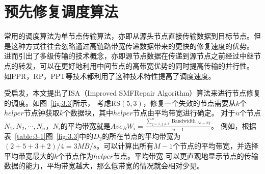 


\section{预先修复调度算法}
常用的调度算法为单节点传输算法，亦即从源头节点直接传输数据到目标节点。但是这种方式往往会忽略通过高链路带宽传递数据带来的更快的修复速度的优势。
进而引出了多级传输的技术概念，亦即源节点数据在传递到源节点之前经过中继节点的转发，可以在更好地利用中间节点的高带宽优势的同时提高传输的并行性。
如PPR\cite{mitra2016partial}，RP\cite{li2017repair}，PPT\cite{bai2019fast}等技术都利用了这种技术特性提高了调度速度。

受\citet{zhou2022bandwidth}启发，本文提出了ISA（Improved SMFRepair Algorithm）算法来进行节点修复的调度。如图~\ref{fig:3.3}所示，
考虑RS$(5,3)$，修复一个失效的节点需要从$k$个$helper$节点钟获取$k$个数据块，其中$helper$节点由平均带宽进行确定。
对于$n$个节点${N_1,N_2,\cdots,N_n}$，$N_i$的平均带宽就是$Ave_BW_i=\frac{\sum_{j=1, j \neq i}^{n} \text { Bandwidth }{ }_{N i-N j}}{n-1}$。
例如，根据表~\ref{table:3-1}\cite{zhou2022bandwidth}图~\ref{fig:3.3}中的$D_2$的所在节点的平均带宽为
$(2+5+3+2)/4=3MB/s$。可以计算出所有$M-1$个节点的平均带宽，并选择平均带宽最大的$k$个节点作为$helper$节点。平均带宽
可以更直观地显示节点的传输数据的能力，平均带宽越大，那么低带宽的情况就会相对少见。

